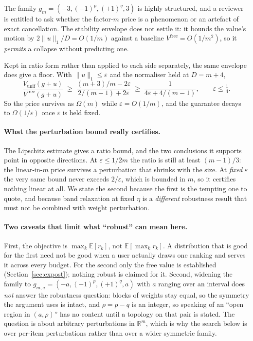 The family $g_{m}=(-3,(-1)^{p},(+1)^{q},3)$ is highly structured, and a reviewer is
entitled to ask whether the factor-$m$ price is a phenomenon or an artefact of exact
cancellation. The stability envelope does not settle it: it bounds the value's motion by
$2\|u\|_{1}/D=O(1/m)$ against a baseline $V^{\mathrm{free}}=O(1/m^{2})$, so it
\emph{permits} a collapse without predicting one.

Kept in ratio form rather than applied to each side separately, the same envelope does
give a floor. With $\|u\|_{1}\le\varepsilon$ and the normaliser held at $D=m+4$,
\[
\frac{V_{\mathrm{unif}}(g+u)}{V^{\mathrm{free}}(g+u)}
\;\ge\;
\frac{(m+3)/m-2\varepsilon}{2/(m-1)+2\varepsilon}
\;\ge\;
\frac{1}{4\varepsilon+4/(m-1)} ,
\qquad \varepsilon\le\tfrac14 .
\]
So the price survives as $\Omega(m)$ while $\varepsilon=O(1/m)$, and the guarantee decays
to $\Omega(1/\varepsilon)$ once $\varepsilon$ is held fixed.


\paragraph{What the perturbation bound really certifies.}
The Lipschitz estimate gives a ratio bound, and the two conclusions it supports point in
opposite directions. At $\varepsilon\le1/2m$ the ratio is still at least $(m-1)/3$: the
linear-in-$m$ price survives a perturbation that shrinks with the size. At \emph{fixed}
$\varepsilon$ the very same bound never exceeds $2/\varepsilon$, which is bounded in $m$, so
it certifies nothing linear at all. We state the second because the first is the tempting one
to quote, and because band relaxation at fixed $\eta$ is a \emph{different} robustness result
that must not be combined with weight perturbation.


\paragraph{Two caveats that limit what ``robust'' can mean here.}
First, the objective is $\max_{k}\mathbb{E}[r_{k}]$, not $\mathbb{E}[\max_{k}r_{k}]$. A
distribution that is good for the first need not be good when a user actually draws one
ranking and serves it across every budget. For the second only the free value is
established (Section~\ref{sec:expost}); nothing robust is claimed for it.
Second, widening the family to $g_{m,a}=(-a,(-1)^{p},(+1)^{q},a)$ with $a$ ranging over an
interval does \emph{not} answer the robustness question: blocks of weights stay equal, so
the symmetry the argument uses is intact, and $\rho=p-q$ is an integer, so speaking of an
``open region in $(a,\rho)$'' has no content until a topology on that pair is stated. The
question is about arbitrary perturbations in $\mathbb{R}^{m}$, which is why the search
below is over per-item perturbations rather than over a wider symmetric family.



